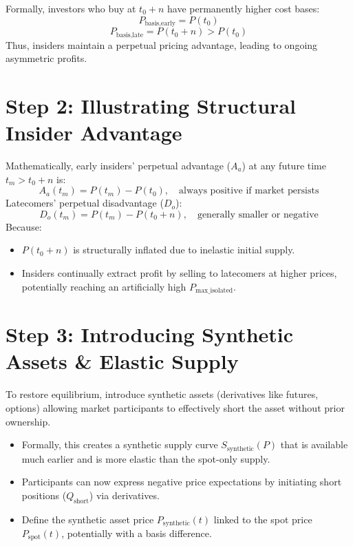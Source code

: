 \documentclass{article}
\begin{document}
Formally, investors who buy at $t_0 + n$ have permanently higher cost bases:
\[
P_{\text{basis,early}} = P(t_0)
\]
\[
P_{\text{basis,late}} = P(t_0 + n) > P(t_0)
\]
Thus, insiders maintain a perpetual pricing advantage, leading to ongoing asymmetric profits.

\section{Step 2: Illustrating Structural Insider Advantage}

Mathematically, early insiders' perpetual advantage ($A_a$) at any future time $t_m > t_0 + n$ is:
\[
A_a(t_m) = P(t_m) - P(t_0), \quad \text{always positive if market persists}
\]
Latecomers' perpetual disadvantage ($D_o$):
\[
D_o(t_m) = P(t_m) - P(t_0 + n), \quad \text{generally smaller or negative}
\]
Because:
\begin{itemize}
    \item $P(t_0 + n)$ is structurally inflated due to inelastic initial supply.
    \item Insiders continually extract profit by selling to latecomers at higher prices, potentially reaching an artificially high $P_{\text{max\_isolated}}$.
\end{itemize}

\section{Step 3: Introducing Synthetic Assets & Elastic Supply}

To restore equilibrium, introduce synthetic assets (derivatives like futures, options) allowing market participants to effectively short the asset without prior ownership.
\begin{itemize}
    \item Formally, this creates a synthetic supply curve $S_{\text{synthetic}}(P)$ that is available much earlier and is more elastic than the spot-only supply.
    \item Participants can now express negative price expectations by initiating short positions ($Q_{\text{short}}$) via derivatives.
    \item Define the synthetic asset price $P_{\text{synthetic}}(t)$ linked to the spot price $P_{\text{spot}}(t)$, potentially with a basis difference.
\end{itemize}
\end{document}
